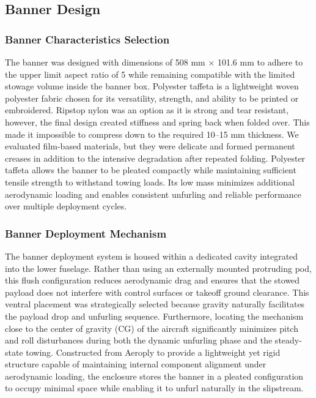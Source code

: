 \documentclass[10pt, letterpaper]{article}
\newcommand{\Filler}{}
\begin{document}
\Filler

\subsection{Banner Design}
\subsubsection{Banner Characteristics Selection}
The banner was designed with dimensions of {508 mm × 101.6 mm} to adhere to the upper limit aspect ratio of 5 while remaining compatible with the limited stowage volume inside the banner box. Polyester taffeta is a lightweight woven polyester fabric chosen for its versatility, strength, and ability to be printed or embroidered. Ripstop nylon was an option as it is strong and tear resistant, however, the final design created stiffness and spring back when folded over. This made it impossible to compress down to the required 10–15 mm thickness. We evaluated film-based materials, but they were delicate and formed permanent creases in addition to the intensive degradation after repeated folding. Polyester taffeta allows the banner to be pleated compactly while maintaining sufficient tensile strength to withstand towing loads. Its low mass minimizes additional aerodynamic loading and enables consistent unfurling and reliable performance over multiple deployment cycles.

\subsubsection{Banner Deployment Mechanism}
The banner deployment system is housed within a dedicated cavity integrated into the lower fuselage. Rather than using an externally mounted protruding pod, this flush configuration reduces aerodynamic drag and ensures that the stowed payload does not interfere with control surfaces or takeoff ground clearance. This ventral placement was strategically selected because gravity naturally facilitates the payload drop and unfurling sequence. Furthermore, locating the mechanism close to the center of gravity (CG) of the aircraft significantly minimizes pitch and roll disturbances during both the dynamic unfurling phase and the steady-state towing. Constructed from Aeroply to provide a lightweight yet rigid structure capable of maintaining internal component alignment under aerodynamic loading, the enclosure stores the banner in a pleated configuration to occupy minimal space while enabling it to unfurl naturally in the slipstream.
\end{document}
